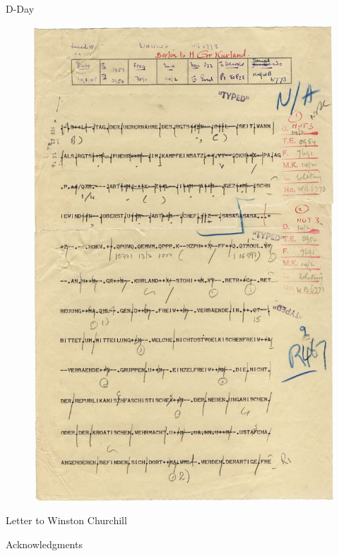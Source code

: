 \documentclass[hyphens,aspectratio=169]{beamer}
\begin{document}
\begin{frame}[fragile]{D-Day}
\begin{center}
    \begin{figure}
        \includegraphics[scale=0.105]{paper/images/bletchley_decrypt.jpg}
    \end{figure}
    \small
    \caption{Example Bletchley Park decrypt}
\end{center}
\end{frame}

\begin{frame}[fragile]{Letter to Winston Churchill}
\end{frame}

\begin{frame}[fragile]{Acknowledgments}
\end{frame}
\end{document}

